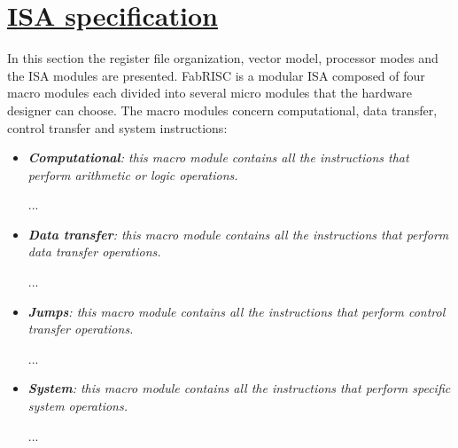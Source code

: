 \documentclass{article}
\begin{document}
    \clearpage

    \section[ISA specification]{\LARGE\underline{ISA specification}} %

        \vspace{10pt}

        In this section the register file organization, vector model, processor modes and the ISA modules are presented. FabRISC is a modular ISA composed of four macro modules each divided into several micro modules that the hardware designer can choose. The macro modules concern computational, data transfer, control transfer and system instructions:

        \begin{itemize}

           \item \textit{\textbf{Computational}: this macro module contains all the instructions that perform arithmetic or logic operations.}

                \begin{itemize}

                    ...

                \end{itemize}

           \item \textit{\textbf{Data transfer}: this macro module contains all the instructions that perform data transfer operations.}

                \begin{itemize}

                    ...

                \end{itemize}

           \item \textit{\textbf{Jumps}: this macro module contains all the instructions that perform control transfer operations.}

                \begin{itemize}

                   ...

                \end{itemize}

           \item \textit{\textbf{System}: this macro module contains all the instructions that perform specific system operations.}

                \begin{itemize}

                    ...

                \end{itemize}

        \end{itemize}
\end{document}

